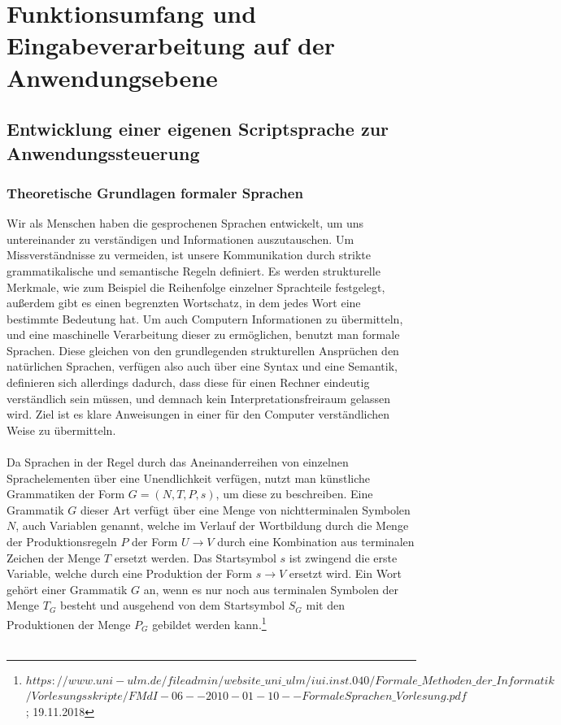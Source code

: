 %
%
%
\section{Funktionsumfang und Eingabeverarbeitung auf der Anwendungsebene}

\subsection{Entwicklung einer eigenen Scriptsprache zur Anwendungssteuerung}
\subsubsection{Theoretische Grundlagen formaler Sprachen}
Wir als Menschen haben die gesprochenen Sprachen entwickelt, um uns untereinander zu verständigen und Informationen auszutauschen. 
Um Missverständnisse zu vermeiden, ist unsere Kommunikation durch strikte grammatikalische und semantische Regeln definiert. 
Es werden strukturelle Merkmale, wie zum Beispiel die Reihenfolge einzelner Sprachteile festgelegt, außerdem gibt es einen begrenzten Wortschatz, in dem jedes Wort eine bestimmte Bedeutung hat.
Um auch Computern Informationen zu übermitteln, und eine maschinelle Verarbeitung dieser zu ermöglichen, benutzt man formale Sprachen. 
Diese gleichen von den grundlegenden strukturellen Ansprüchen den natürlichen Sprachen, verfügen also auch über eine Syntax und eine Semantik, definieren sich allerdings dadurch, dass diese für einen Rechner eindeutig verständlich sein müssen, und demnach kein Interpretationsfreiraum gelassen wird. Ziel ist es klare Anweisungen in einer für den Computer verständlichen Weise zu übermitteln.\\\\
Da Sprachen in der Regel durch das Aneinanderreihen von einzelnen Sprachelementen über eine Unendlichkeit verfügen, nutzt man künstliche Grammatiken der Form $G = (N, T, P, s)$, um diese zu beschreiben. 
Eine Grammatik $G$ dieser Art verfügt über eine Menge von nichtterminalen Symbolen $N$, auch Variablen genannt, welche im Verlauf der Wortbildung durch die Menge der Produktionsregeln $P$ der Form $U \rightarrow V$ durch eine Kombination aus terminalen Zeichen der Menge $T$ ersetzt werden. 
Das Startsymbol $s$ ist zwingend die erste Variable, welche durch eine Produktion der Form $s \rightarrow V$ ersetzt wird. 
Ein Wort gehört einer Grammatik $G$ an, wenn es nur noch aus terminalen Symbolen der Menge $T_G$ besteht und ausgehend von dem Startsymbol $S_G$ mit den Produktionen der Menge $P_G$ gebildet werden kann.\footnote{$	https://www.uni-ulm.de/fileadmin/website\_uni\_ulm/iui.inst.040/Formale\_Methoden\_der\_Informatik$\\$/Vorlesungsskripte/FMdI-06--2010-01-10--FormaleSprachen\_Vorlesung.pdf$
; 19.11.2018}\\\\
